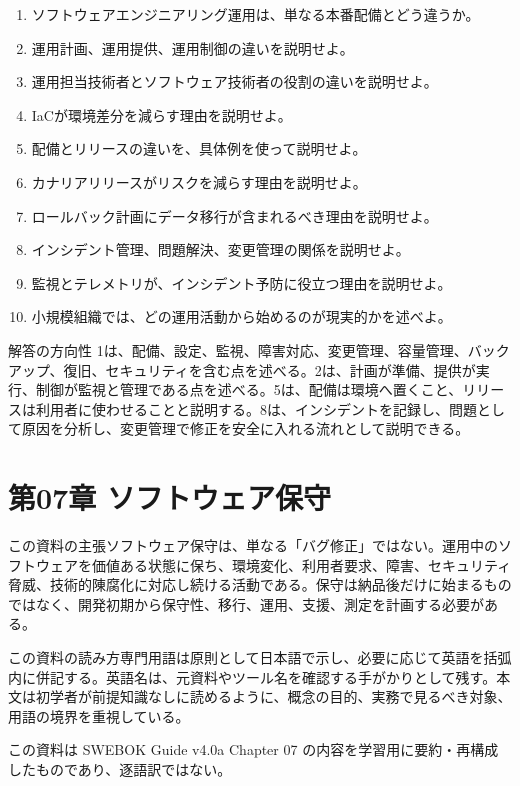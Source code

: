 \documentclass[a4paper,11pt]{ltjsarticle}
\numberwithin{figure}{section}
\numberwithin{table}{section}
\begin{document}
\begin{enumerate}
  \item ソフトウェアエンジニアリング運用は、単なる本番配備とどう違うか。
  \item 運用計画、運用提供、運用制御の違いを説明せよ。
  \item 運用担当技術者とソフトウェア技術者の役割の違いを説明せよ。
  \item IaCが環境差分を減らす理由を説明せよ。
  \item 配備とリリースの違いを、具体例を使って説明せよ。
  \item カナリアリリースがリスクを減らす理由を説明せよ。
  \item ロールバック計画にデータ移行が含まれるべき理由を説明せよ。
  \item インシデント管理、問題解決、変更管理の関係を説明せよ。
  \item 監視とテレメトリが、インシデント予防に役立つ理由を説明せよ。
  \item 小規模組織では、どの運用活動から始めるのが現実的かを述べよ。
\end{enumerate}

\begin{pointbox}{解答の方向性}
1は、配備、設定、監視、障害対応、変更管理、容量管理、バックアップ、復旧、セキュリティを含む点を述べる。2は、計画が準備、提供が実行、制御が監視と管理である点を述べる。5は、配備は環境へ置くこと、リリースは利用者に使わせることと説明する。8は、インシデントを記録し、問題として原因を分析し、変更管理で修正を安全に入れる流れとして説明できる。
\end{pointbox}

\section{第07章 ソフトウェア保守}
\begin{pointbox}{この資料の主張}ソフトウェア保守は、単なる「バグ修正」ではない。運用中のソフトウェアを価値ある状態に保ち、環境変化、利用者要求、障害、セキュリティ脅威、技術的陳腐化に対応し続ける活動である。保守は納品後だけに始まるものではなく、開発初期から保守性、移行、運用、支援、測定を計画する必要がある。\end{pointbox}
\begin{pointbox}{この資料の読み方}専門用語は原則として日本語で示し、必要に応じて英語を括弧内に併記する。英語名は、元資料やツール名を確認する手がかりとして残す。本文は初学者が前提知識なしに読めるように、概念の目的、実務で見るべき対象、用語の境界を重視している。\end{pointbox}
この資料は SWEBOK Guide v4.0a Chapter 07 の内容を学習用に要約・再構成したものであり、逐語訳ではない。\par
\end{document}
